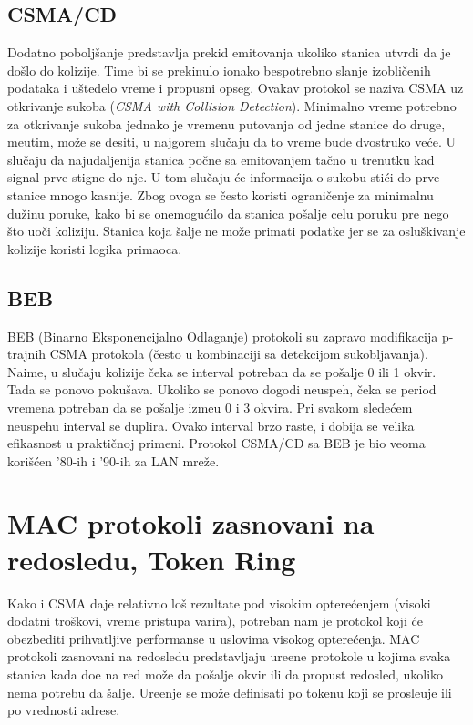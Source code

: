 \documentclass{article} %
\begin{document}
\subsection{CSMA/CD}

Dodatno pobolj\v{s}anje predstavlja prekid emitovanja ukoliko stanica utvrdi da je do\v{s}lo do kolizije. Time bi se prekinulo ionako bespotrebno slanje izobli\v{c}enih podataka i u\v{s}tedelo vreme i propusni opseg. Ovakav protokol se naziva CSMA uz otkrivanje sukoba (\textit{CSMA with Collision Detection}). Minimalno vreme potrebno za otkrivanje sukoba jednako je vremenu putovanja od jedne stanice do druge, me\dj{}utim, mo\v{z}e se desiti, u najgorem slu\v{c}aju da to vreme bude dvostruko ve\'{c}e. U slu\v{c}aju da najudaljenija stanica po\v{c}ne sa emitovanjem ta\v{c}no u trenutku kad signal prve stigne do nje. U tom slu\v{c}aju \'{c}e informacija o sukobu sti\'{c}i do prve stanice mnogo kasnije. Zbog ovoga se \v{c}esto koristi ograni\v{c}enje za minimalnu du\v{z}inu poruke, kako bi se onemogu\'{c}ilo da stanica po\v{s}alje celu poruku pre nego \v{s}to uo\v{c}i koliziju.  Stanica koja \v{s}alje ne mo\v{z}e primati podatke jer se za oslu\v{s}kivanje kolizije koristi logika primaoca.

\subsection{BEB}

BEB (Binarno Eksponencijalno Odlaganje) protokoli su zapravo modifikacija p-trajnih CSMA protokola (\v{c}esto u kombinaciji sa detekcijom sukobljavanja). Naime, u slu\v{c}aju kolizije \v{c}eka se interval potreban da se po\v{s}alje 0 ili 1 okvir. Tada se ponovo poku\v{s}ava. Ukoliko se ponovo dogodi neuspeh, \v{c}eka se period vremena potreban da se po\v{s}alje izme\dj{}u 0 i 3 okvira. Pri svakom slede\'{c}em neuspehu interval se duplira. Ovako interval brzo raste, i dobija se velika efikasnost u prakti\v{c}noj primeni. Protokol CSMA/CD sa BEB je bio veoma kori\v{s}\'{c}en '80-ih i '90-ih za LAN mre\v{z}e.

\section{MAC protokoli zasnovani na redosledu, Token Ring}

Kako i CSMA daje relativno lo\v{s} rezultate pod visokim optere\'{c}enjem (visoki dodatni tro\v{s}kovi, vreme pristupa varira), potreban nam je protokol koji \'{c}e obezbediti prihvatljive performanse u uslovima visokog optere\'{c}enja.
MAC protokoli zasnovani na redosledu predstavljaju ure\dj{}ene protokole u kojima svaka stanica kada do\dj{}e na red mo\v{z}e da po\v{s}alje okvir ili da propust redosled, ukoliko nema potrebu da \v{s}alje. Ure\dj{}enje se mo\v{z}e definisati po tokenu koji se prosle\dj{}uje ili po vrednosti adrese.
\end{document}
